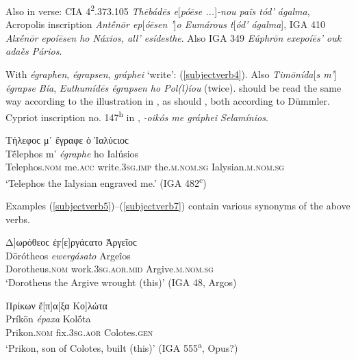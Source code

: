Also in verse: CIA 4\textsuperscript{2}.373.105 \textit{Thēbádēs \emph{e}}{[}\textit{\emph{póēse} ...}{]}\textit{-nou paîs tód' ágalma}, Acropolis inscription \citep[135ff.]{Studniczka1887} \textit{Antḗnōr \emph{ep}}{[}\textit{\emph{óēsen} '}{]}\textit{o Eumárous t}{[}\textit{ód' ágalma}{]}, IGA 410 \textit{Alxḗnōr \emph{epoíēsen} ho Náxios, all' esídesthe}. Also IGA 349 \textit{Eúphrōn \emph{exepoíēs'} ouk adaḕs Pários}.

With \textit{égraphen}, \textit{égrapsen}, \textit{gráphei} `write': (\ref{subjectverb4}). Also \citet[29]{Klein1887} \textit{Timōnída}{[}\textit{s m'}{]} \textit{\emph{égrapse} Bía}, \citet[196.7]{Klein1887} \textit{Euthumídēs \emph{égrapsen} ho Pol(l)íou} (twice). \citet[194.2]{Klein1887} should be read the same way according to the illustration in \citet[Figure 188]{Gerhard1847}, as should \citet[195]{Klein1887}, both according to Dümmler.\label{kleinx2} Cypriot inscription no. 147\textsuperscript{h} in \citet[148]{Meister1889}, \textit{-oikós me \emph{gráphei} Selamínios}.

\begin{exe}
\ex Τήλεφοϲ μ᾽ ἔγραφε ὁ Ἰαλύϲιοϲ\\
\gll Tḗlephos m' \emph{égraphe} ho Ialúsios\\
Telephos.\textsc{nom} me.\textsc{acc} write.\textsc{3sg.imp} the.\textsc{m.nom.sg} Ialysian.\textsc{m.nom.sg}\\
\trans `Telephos the Ialysian engraved me.' (IGA 482\textsuperscript{c}) 
\label{subjectverb4}
\end{exe}

Examples (\ref{subjectverb5})--(\ref{subjectverb7}) contain various synonyms of the above verbs.

\begin{exe}
\ex {[}Δ{]}ωρόθεοϲ ἐϝ{[}ε{]}ργάϲατο Ἀργεῖοϲ\\
\gll Dōrótheos \emph{ewergásato} Argeîos\\
Dorotheus.\textsc{nom} work.\textsc{3sg.aor.mid} Argive.\textsc{m.nom.sg}\\
\trans `Dorotheus the Argive wrought (this)' (IGA 48, Argos) 
\label{subjectverb5}
\end{exe}

\begin{exe}
\ex Πρίκων ἔ{[}π{]}α{[}ξα Κο{]}λώτα\\
\gll Príkōn \emph{épaxa} Kolṓta\\
Prikon.\textsc{nom} fix.\textsc{3sg.aor} Colotes.\textsc{gen}\\
\trans `Prikon, son of Colotes, built (this)' (IGA 555\textsuperscript{a}, Opus?) 
\label{subjectverb6}
\end{exe}

